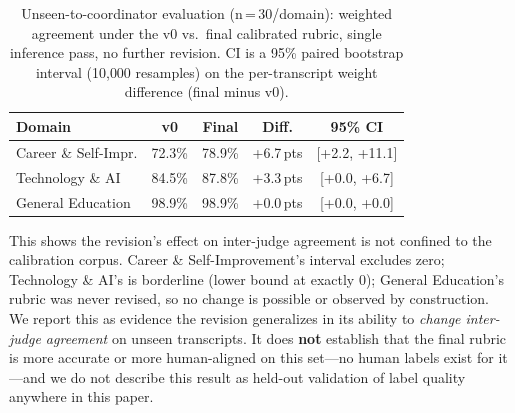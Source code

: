 \documentclass[11pt]{article}
\begin{document}
\begin{table}[ht]
\centering
\caption{Unseen-to-coordinator evaluation (n\,=\,30/domain): weighted
agreement under the v0 vs.\ final calibrated rubric, single inference pass,
no further revision. CI is a 95\% paired bootstrap interval (10{,}000
resamples) on the per-transcript weight difference (final minus v0).}
\label{tab:heldout}
\small
\begin{tabular}{lcccc}
\toprule
\textbf{Domain} & \textbf{v0} & \textbf{Final} & \textbf{Diff.} & \textbf{95\% CI} \\
\midrule
Career \& Self-Impr. & 72.3\% & 78.9\% & +6.7\,pts & [+2.2, +11.1] \\
Technology \& AI     & 84.5\% & 87.8\% & +3.3\,pts & [+0.0, +6.7]  \\
General Education    & 98.9\% & 98.9\% & +0.0\,pts & [+0.0, +0.0]  \\
\bottomrule
\end{tabular}
\end{table}

This shows the revision's effect on inter-judge agreement is not confined
to the calibration corpus. Career \& Self-Improvement's interval excludes
zero; Technology \& AI's is borderline (lower bound at exactly 0); General
Education's rubric was never revised, so no change is possible or observed
by construction. We report this as evidence the revision generalizes in
its ability to \emph{change inter-judge agreement} on unseen transcripts.
It does \textbf{not} establish that the final rubric is more accurate or
more human-aligned on this set---no human labels exist for it---and we do
not describe this result as held-out validation of label quality anywhere
in this paper.
\end{document}

